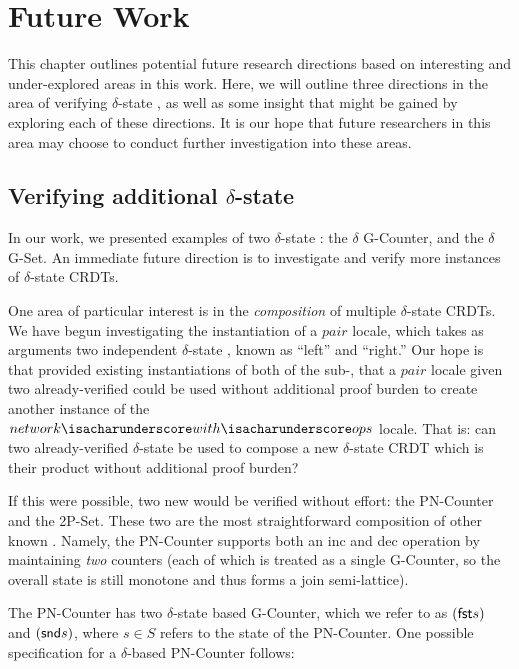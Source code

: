 \chapter{Future Work}
\label{chap:future-work}

This chapter outlines potential future research directions based on interesting
and under-explored areas in this work. Here, we will outline three directions in
the area of verifying $\delta$-state \CRDTs, as well as some insight that might
be gained by exploring each of these directions. It is our hope that future
researchers in this area may choose to conduct further investigation into these
areas.

\section{Verifying additional $\delta$-state \CRDTs}
\label{sec:future-pair-locale}
In our work, we presented examples of two $\delta$-state \CRDTs: the $\delta$
G-Counter, and the $\delta$ G-Set. An immediate future direction is to
investigate and verify more instances of $\delta$-state CRDTs.

One area of particular interest is in the \emph{composition} of multiple
$\delta$-state CRDTs. We have begun investigating the instantiation of a $pair$
locale, which takes as arguments two independent $\delta$-state \CRDTs, known as
``left'' and ``right.'' Our hope is that provided existing instantiations of
both of the sub-\CRDTs, that a $pair$ locale given two already-verified \CRDTs
could be used without additional proof burden to create another instance of the
$network{\isacharunderscore}with{\isacharunderscore}ops$ locale. That is: can
two already-verified $\delta$-state \CRDTs be used to compose a new
$\delta$-state CRDT which is their product without additional proof burden?

If this were possible, two new \CRDTs would be verified without effort: the
PN-Counter and the 2P-Set. These two \CRDTs are the most straightforward
composition of other known \CRDTs. Namely, the PN-Counter supports both an
\textsf{inc} and \textsf{dec} operation by maintaining \emph{two} counters (each
of which is treated as a single G-Counter, so the overall state is still
monotone and thus forms a join semi-lattice).

The PN-Counter has two $\delta$-state based G-Counter, which we refer to as
$(\textsf{fst} s)$ and $(\textsf{snd} s)$, where $s \in S$ refers to the state of the
PN-Counter. One possible specification for a $\delta$-based PN-Counter follows:

